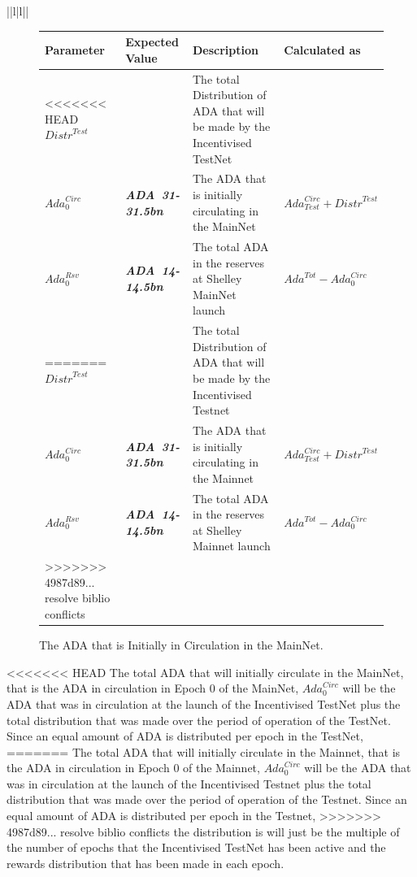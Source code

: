 \documentclass[11pt,a4paper,dvipsnames,twosided,final]{article}
\newcommand{\ada}{ADA{}}
\newcommand{\ADA}[1]{\textbf{\emph{\ada~{#1}}}}
\begin{document}
\begin{tabular}{||l|l||}
\clearpage
\begin{figure}[h!]
\begin{center}
\begin{tabular}{||l|l|p{6cm}|l||}
  \hline \hline
\textbf{Parameter} & \textbf{Expected Value} & \textbf{Description} & \textbf{Calculated as} \\\hline
<<<<<<< HEAD
${\textit{Distr}}^{Test}$ & & The total Distribution of \ada{} that will be made by the Incentivised TestNet & \\\hline
$\textit{Ada}^{\textit{Circ}}_{0}$ & \ADA{31-31.5bn} & The \ada{} that is initially circulating in the MainNet & $\textit{Ada}^{\textit{Circ}}_{\textit{Test}} + {\textit{Distr}}^{\textit{Test}}$ \\\hline
$\textit{Ada}^{\textit{Rsv}}_{0}$ & \ADA{14-14.5bn} & The total \ada{} in the reserves at Shelley MainNet launch & $\textit{Ada}^{Tot} - \textit{Ada}^{\textit{Circ}}_{0}$ \\\hline
=======
${\textit{Distr}}^{Test}$ & & The total Distribution of \ada{} that will be made by the Incentivised Testnet & \\\hline
$\textit{Ada}^{\textit{Circ}}_{0}$ & \ADA{31-31.5bn} & The \ada{} that is initially circulating in the Mainnet & $\textit{Ada}^{\textit{Circ}}_{\textit{Test}} + {\textit{Distr}}^{\textit{Test}}$ \\\hline
$\textit{Ada}^{\textit{Rsv}}_{0}$ & \ADA{14-14.5bn} & The total \ada{} in the reserves at Shelley Mainnet launch & $\textit{Ada}^{Tot} - \textit{Ada}^{\textit{Circ}}_{0}$ \\\hline
>>>>>>> 4987d89... resolve biblio conflicts
\hline
\end{tabular}
\end{center}
\caption{The \ada{} that is Initially in Circulation in the MainNet.}
\end{figure}

\noindent
<<<<<<< HEAD
The total \ada{} that will initially circulate in the MainNet, that is the \ada{} in circulation in Epoch 0 of the MainNet,
$\textit{Ada}^{\textit{Circ}}_{0}$ will be the \ada{} that was in circulation at the launch of the Incentivised
TestNet plus the total distribution that was made over the period of operation of the TestNet.
Since an equal amount of \ada{} is distributed per epoch in
the TestNet,
=======
The total \ada{} that will initially circulate in the Mainnet, that is the \ada{} in circulation in Epoch 0 of the Mainnet,
$\textit{Ada}^{\textit{Circ}}_{0}$ will be the \ada{} that was in circulation at the launch of the Incentivised
Testnet plus the total distribution that was made over the period of operation of the Testnet.
Since an equal amount of \ada{} is distributed per epoch in
the Testnet,
>>>>>>> 4987d89... resolve biblio conflicts
the distribution is will just be the multiple of the number of epochs that the Incentivised TestNet has
been active and the rewards distribution that has been made in each epoch.



\end{tabular}
\end{document}
